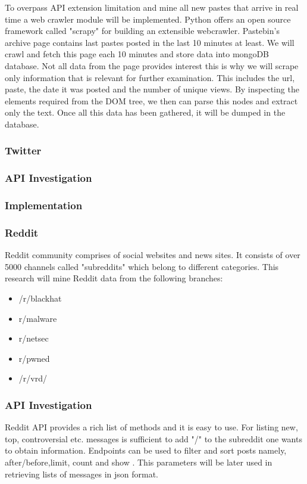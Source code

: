 \documentclass[12pt]{article}
\begin{document}
To overpass API extension limitation and mine all new pastes that arrive in real time a web crawler module will be implemented. Python offers an open source framework called "scrapy" \cite{scrapy} for building an extensible webcrawler. Pastebin's archive page contains last pastes posted in the last 10 minutes at least. We will crawl and fetch this page each 10 minutes and store data into mongoDB database. Not all data from the page provides interest this is why we will scrape only information that is relevant for further examination. This includes the url, paste, the date it was posted and the number of unique views. By inspecting the elements required from the DOM tree, we then can parse this nodes and extract only the text. Once all this data has been gathered, it will be dumped in the database.

 
 

\subsubsection*{Twitter}
\subsubsection{API Investigation}
\subsubsection{Implementation}
\subsubsection*{Reddit}
Reddit community comprises of social websites and news sites. It consists of over 5000 channels called "subreddits" which belong to different categories. This research will mine Reddit \cite{reddit} data from the following branches:
\begin{itemize}
\item /r/blackhat \cite{red-blackhat}
\item r/malware \cite{r.malware}
\item r/netsec \cite{r.netsec}
\item r/pwned \cite{r.pwned}
\item /r/vrd/ \cite{r.rvd}

\end{itemize}

\subsubsection{API Investigation}
Reddit API\cite{reddit} provides a rich list of methods and it is easy to use. For listing new, top, controversial etc. messages is sufficient to add "/" to the subreddit one wants to obtain information. Endpoints can be used to filter and sort posts namely, after/before,limit, count and show \cite{reddit}. This parameters will be later used in retrieving lists of messages in json format. 
\end{document}
